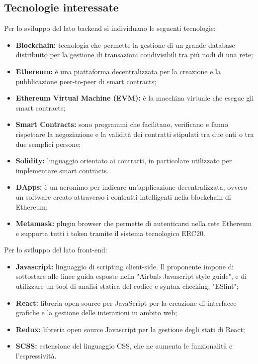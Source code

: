 \subsection{Tecnologie interessate}
Per lo sviluppo del lato backend si individuano le seguenti tecnologie:
\begin{itemize}
    \item \textbf{Blockchain:} tecnologia che permette la gestione di un grande 
database distribuito per la gestione di transazioni condivisibili tra più nodi 
di una rete;
	\item \textbf{Ethereum:} è una piattaforma decentralizzata per la creazione
	e la pubblicazione peer-to-peer di smart contracts;
	\item \textbf{Ethereum Virtual Machine (EVM):} è la macchina virtuale che 
esegue gli smart contracts;
	\item \textbf{Smart Contracts:} sono programmi che facilitano, verificano e 
fanno rispettare la negoziazione e la validità dei contratti stipulati tra due 
enti o tra due semplici persone;
	\item \textbf{Solidity:} linguaggio orientato ai contratti, in particolare 
utilizzato per implementare smart contracts.
	\item \textbf{DApps:} è un acronimo per indicare un'applicazione 
decentralizzata, ovvero un software creato attraverso i contratti intelligenti 
nella blockchain di Ethereum;
	\item \textbf{Metamask:} plugin browser che permette di autenticarsi nella rete 
Ethereum e supporta tutti i token tramite il sistema tecnologico ERC20.
\end{itemize}

Per lo sviluppo del lato front-end:
\begin{itemize}
	\item \textbf{Javascript:} linguaggio di scripting client-side. Il proponente 
impone di sottostare alle linee guida esposte nella "Airbnb Javascript style 
guide", e di utilizzare un tool di analisi statica del codice e syntax checking, 
"ESlint"\glo;
	\item \textbf{React:}  libreria open source per JavaScript per la creazione di 
interfacce grafiche e la gestione delle interazioni in ambito web;
	\item \textbf {Redux:} libreria open source Javascript per la gestione degli 
stati di React;
	\item \textbf{SCSS:} estensione del linguaggio CSS, che ne aumenta le 
funzionalità e l'espressività.
\end{itemize}


